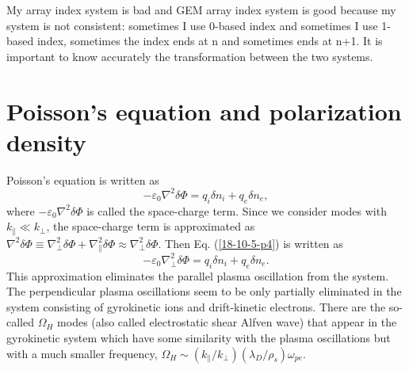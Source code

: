 \documentclass{article}
\begin{document}
\

\

\

\

\

My array index system is bad and GEM array index system is good because my
system is not consistent: sometimes I use 0-based index and sometimes I use
1-based index, sometimes the index ends at n and sometimes ends at n+1. It is
important to know accurately the transformation between the two systems.

\section{Poisson's equation and polarization density}\label{19-1-4-1}

Poisson's equation is written as
\begin{equation}
  \label{18-10-5-p4} - \varepsilon_0 \nabla^2 \delta \Phi = q_i \delta n_i +
  q_e \delta n_e,
\end{equation}
where $- \varepsilon_0 \nabla^2 \delta \Phi$ is called the space-charge term.
Since we consider modes with $k_{\parallel} \ll k_{\perp}$, the space-charge
term is approximated as $\nabla^2 \delta \Phi \equiv \nabla^2_{\perp} \delta
\Phi + \nabla^2_{\parallel} \delta \Phi \approx \nabla^2_{\perp} \delta \Phi$.
Then Eq. (\ref{18-10-5-p4}) is written as
\begin{equation}
  \label{19-1-12-e2} - \varepsilon_0 \nabla^2_{\perp} \delta \Phi = q_i \delta
  n_i + q_e \delta n_e .
\end{equation}
This approximation eliminates the parallel plasma oscillation from the system.
The perpendicular plasma oscillations seem to be only partially eliminated in
the system consisting of gyrokinetic ions and drift-kinetic electrons. There
are the so-called $\Omega_H$ modes (also called electrostatic shear Alfven
wave) that appear in the gyrokinetic system which have some similarity with
the plasma oscillations but with a much smaller frequency, $\Omega_H \sim
(k_{\parallel} / k_{\perp}) (\lambda_D / \rho_s) \omega_{p e}$.
\end{document}
